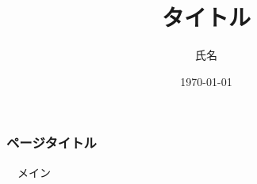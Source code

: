 ﻿\documentclass[14pt,dvipdfmx]{beamer}
\title[タイトル略]{タイトル}
\author[Myoji]{氏名}
\date[\today]{\small\today}
\institute[大学名略]{大学名 \and 研究室名}
\begin{document}
\frame{\maketitle}

\begin{frame}\frametitle{ページタイトル}
　メイン
\end{frame}
\end{document}

